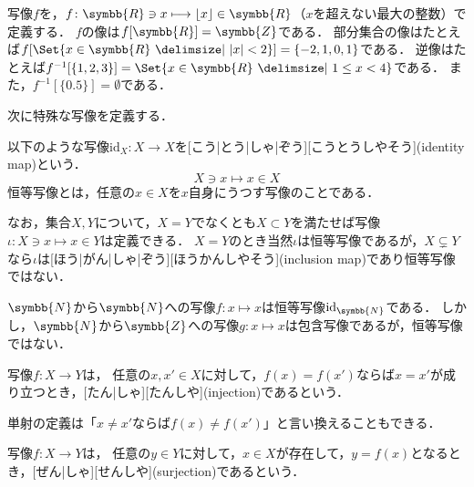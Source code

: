 \documentclass[../sotsu.tex]{subfiles}
\begin{document}
\begin{example}
    写像$f$を，$f \colon \symbb{R} \ni x \longmapsto \lfloor x \rfloor \in \symbb{R}$（$x$を超えない最大の整数）で定義する．
    $f$の像は$f[\symbb{R}] = \symbb{Z}$である．
    部分集合の像はたとえば$f[ \Set{  x \in \symbb{R}  \given  \abs{x} < 2  } ] = \{ -2, 1, 0, 1 \}$である．
    逆像はたとえば$f^{-1}[ \{ 1, 2, 3 \} ] = \Set{  x \in \symbb{R}  \given  1 \leq x < 4  }$である．
    また，$f^{-1}[ \{ 0.5 \} ] = \emptyset$である．
\end{example}


次に特殊な写像を定義する．

\begin{definition}[恒等写像]
    \label{dfn:identity-map}
    以下のような写像$\mathrm{id}_X \colon X \to X$を[こう|とう|しゃ|ぞう][こうとうしやそう](identity map)という．
    \[ X \ni x \longmapsto x \in X \]
    恒等写像とは，任意の$x \in X$を$x$自身にうつす写像のことである．
\end{definition}

なお，集合$X, Y$について，$X = Y$でなくとも$X \subset Y$を満たせば写像$\iota \colon X \ni x \mapsto x \in Y$は定義できる．
$X = Y$のとき当然$\iota$は恒等写像であるが，$X \subsetneq Y$なら$\iota$は[ほう|がん|しゃ|ぞう][ほうかんしやそう](inclusion map)であり恒等写像ではない．

\begin{example}
    $\symbb{N}$から$\symbb{N}$への写像$f \colon x \mapsto x$は恒等写像$\mathrm{id}_{\symbb{N}}$である．
    しかし，$\symbb{N}$から$\symbb{Z}$への写像$g \colon x \mapsto x$は包含写像であるが，恒等写像ではない．
\end{example}

\begin{definition}[単射]
    \label{dfn:injection}
    写像$f \colon X \to Y$は，
    任意の$x, x' \in X$に対して，$f(x) = f(x')$ならば$x = x'$が成り立つとき，[たん|しゃ][たんしや](injection)であるという．
\end{definition}

単射の定義は「$x \neq x'$ならば$f(x) \neq f(x')$」と言い換えることもできる．

\begin{definition}[全射]
    \label{dfn:surjection}
    写像$f \colon X \to Y$は，
    任意の$y \in Y$に対して，$x \in X$が存在して，$y = f(x)$となるとき，[ぜん|しゃ][せんしや](surjection)であるという．
\end{definition}
\end{document}
